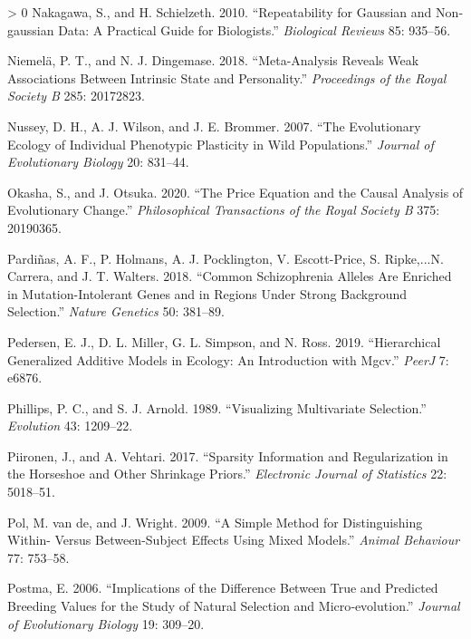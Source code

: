 \documentclass{article}
\newlength{\cslhangindent}
\newenvironment{CSLReferences}[3] %
 {%
  \setlength{\parindent}{0pt}
  \ifodd #1 \everypar{\setlength{\hangindent}{\cslhangindent}}\ignorespaces\fi
  \ifnum #2 > 0
  \setlength{\parskip}{#2\baselineskip}
  \fi
 }%
 {}
\begin{document}
\begin{CSLReferences}{1}{0}
\leavevmode\hypertarget{ref-Naka2010}{}%
Nakagawa, S., and H. Schielzeth. 2010. {``Repeatability for Gaussian and
Non‐gaussian Data: A Practical Guide for Biologists.''} \emph{Biological
Reviews} 85: 935--56.

\leavevmode\hypertarget{ref-Niem2018}{}%
Niemelä, P. T., and N. J. Dingemase. 2018. {``Meta-Analysis Reveals Weak
Associations Between Intrinsic State and Personality.''}
\emph{Proceedings of the Royal Society B} 285: 20172823.

\leavevmode\hypertarget{ref-Nus2007}{}%
Nussey, D. H., A. J. Wilson, and J. E. Brommer. 2007. {``The
Evolutionary Ecology of Individual Phenotypic Plasticity in Wild
Populations.''} \emph{Journal of Evolutionary Biology} 20: 831--44.

\leavevmode\hypertarget{ref-Okasha2020}{}%
Okasha, S., and J. Otsuka. 2020. {``The Price Equation and the Causal
Analysis of Evolutionary Change.''} \emph{Philosophical Transactions of
the Royal Society B} 375: 20190365.

\leavevmode\hypertarget{ref-Pard2018}{}%
Pardiñas, A. F., P. Holmans, A. J. Pocklington, V. Escott-Price, S.
Ripke,...N. Carrera, and J. T. Walters. 2018. {``Common Schizophrenia
Alleles Are Enriched in Mutation-Intolerant Genes and in Regions Under
Strong Background Selection.''} \emph{Nature Genetics} 50: 381--89.

\leavevmode\hypertarget{ref-Pedersen2019}{}%
Pedersen, E. J., D. L. Miller, G. L. Simpson, and N. Ross. 2019.
{``Hierarchical Generalized Additive Models in Ecology: An Introduction
with Mgcv.''} \emph{PeerJ} 7: e6876.

\leavevmode\hypertarget{ref-Phillips1989}{}%
Phillips, P. C., and S. J. Arnold. 1989. {``Visualizing Multivariate
Selection.''} \emph{Evolution} 43: 1209--22.

\leavevmode\hypertarget{ref-Piir2017}{}%
Piironen, J., and A. Vehtari. 2017. {``Sparsity Information and
Regularization in the Horseshoe and Other Shrinkage Priors.''}
\emph{Electronic Journal of Statistics} 22: 5018--51.

\leavevmode\hypertarget{ref-Pol2009}{}%
Pol, M. van de, and J. Wright. 2009. {``A Simple Method for
Distinguishing Within- Versus Between-Subject Effects Using Mixed
Models.''} \emph{Animal Behaviour} 77: 753--58.

\leavevmode\hypertarget{ref-Postma2006}{}%
Postma, E. 2006. {``Implications of the Difference Between True and
Predicted Breeding Values for the Study of Natural Selection and
Micro‐evolution.''} \emph{Journal of Evolutionary Biology} 19: 309--20.


\end{CSLReferences}
\end{document}
